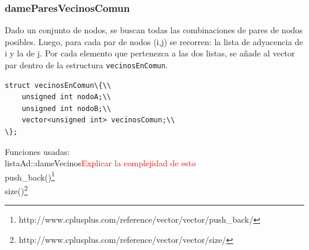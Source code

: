 \subsubsection{dameParesVecinosComun}\label{vec1}

Dado un conjunto de nodos, se buscan todas las combinaciones de pares de nodos posibles. 
Luego, para cada par de nodos (i,j) se recorren: la lista de adyacencia de i y la de j. 
Por cada elemento que pertenezca a las dos listas, se a\~nade al vector par dentro de la estructura \texttt{vecinosEnComun}.


	\begin{codesnippet}
	\begin{verbatim}
struct vecinosEnComun\{\\
    unsigned int nodoA;\\	
    unsigned int nodoB;\\
    vector<unsigned int> vecinosComun;\\
\};
	\end{verbatim}
	\end{codesnippet}

\begin{algorithm}[h!]
\end{algorithm}

Funciones usadas:\\
listaAd::dameVecinos\textcolor{red}{Explicar la complejidad de esto}\\
push_back()\footnote{http://www.cplusplus.com/reference/vector/vector/push_back/}\\
size()\footnote{http://www.cplusplus.com/reference/vector/vector/size/}\\

